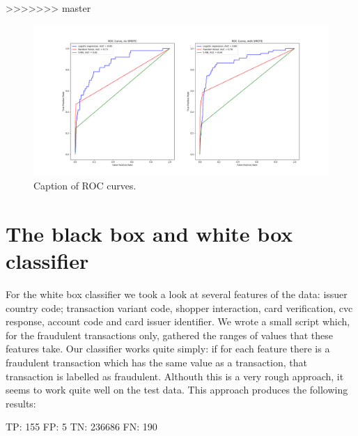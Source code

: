 \documentclass[]{article}
\begin{document}
>>>>>>> master
\begin{figure}[h!]
	\centering
	\includegraphics[scale = 0.25]{Visualizations/ROC_curves}
	\caption{Caption of ROC curves.}
\end{figure}
\clearpage
\section{The black box and white box classifier}
For the white box classifier we took a look at several features of the data: issuer country code; transaction variant code, shopper interaction, card verification, cvc response, account code and card issuer identifier. We wrote a small script which, for the fraudulent transactions only, gathered the ranges of values that these features take. Our classifier works quite simply: if for each feature there is a fraudulent transaction which has the same value as a transaction, that transaction is labelled as fraudulent. Althouth this is a very rough approach, it seems to work quite well on the test data. This approach produces the following results:

\begin{flushleft}
TP: 155 \newline
FP: 5  \newline
TN: 236686 \newline
FN: 190 \newline
\end{flushleft}
\end{document}
